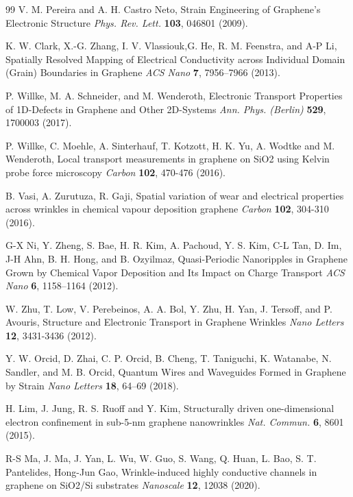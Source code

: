 \documentclass[preprint,aps,preprint,amsmath,amssymb]{revtex4-1}
\begin{document}
\begin{thebibliography} {99}
 V. M. Pereira and A. H. Castro Neto, Strain Engineering of Graphene’s Electronic Structure \textit{Phys. Rev. Lett.} \textbf{103}, 046801 (2009).

 K. W. Clark, X.-G. Zhang, I. V. Vlassiouk,G. He, R. M. Feenstra, and A-P Li, Spatially Resolved Mapping of Electrical Conductivity across Individual Domain (Grain) Boundaries in Graphene \textit{ACS Nano} \textbf{7}, 7956–7966 (2013).

 P. Willke, M. A. Schneider, and M. Wenderoth, Electronic Transport Properties of 1D-Defects in Graphene and Other 2D-Systems \textit{Ann. Phys. (Berlin)} \textbf{529}, 1700003 (2017).

 P. Willke, C. Moehle, A. Sinterhauf, T. Kotzott, H. K. Yu,
A. Wodtke and M. Wenderoth, Local transport measurements in graphene on SiO2 using Kelvin probe force microscopy \textit{Carbon} \textbf{102}, 470-476 (2016).

 B. Vasi, A. Zurutuza, R. Gaji, Spatial variation of wear and electrical properties across wrinkles in chemical vapour deposition graphene \textit{Carbon} \textbf{102}, 304-310 (2016).

 G-X Ni, Y. Zheng, S. Bae, H. R. Kim, A. Pachoud, Y. S. Kim, C-L Tan, D. Im, J-H Ahn,  B. H. Hong, and B. Ozyilmaz, Quasi-Periodic Nanoripples in Graphene Grown by Chemical Vapor Deposition and Its Impact on Charge Transport \textit{ACS Nano} \textbf{6}, 1158–1164 (2012).

 W. Zhu, T. Low, V. Perebeinos, A. A. Bol, Y. Zhu, H. Yan, J. Tersoff, and P. Avouris, Structure and Electronic Transport in Graphene Wrinkles \textit{ Nano Letters} \textbf{12}, 3431-3436 (2012).

 Y. W. Orcid, D. Zhai, C. P. Orcid, B. Cheng, T. Taniguchi, K. Watanabe, N. Sandler, and M. B. Orcid, Quantum Wires and Waveguides Formed in Graphene by Strain \textit{ Nano Letters} \textbf{18}, 64–69 (2018).

 H. Lim, J. Jung, R. S. Ruoff and Y. Kim, Structurally driven one-dimensional electron confinement in sub-5-nm graphene nanowrinkles \textit{ Nat. Commun.} \textbf{6}, 8601 (2015).

 R-S Ma, J. Ma, J. Yan, L. Wu, W. Guo, S. Wang, Q. Huan, L. Bao, S. T. Pantelides, Hong-Jun Gao, Wrinkle-induced highly conductive channels in graphene on SiO2/Si substrates \textit{Nanoscale} \textbf{12}, 12038 (2020).


\end{thebibliography}
\end{document}

